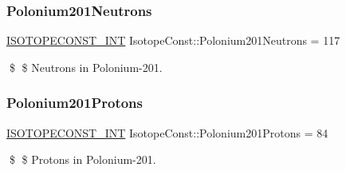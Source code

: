 \subsubsection{\texorpdfstring{Polonium201\+Neutrons}{Polonium201Neutrons}}
{\footnotesize\ttfamily \mbox{\hyperlink{group___isotope_const-_macros_ga5f18360b3e99483a35c32d789e62621c}{I\+S\+O\+T\+O\+P\+E\+C\+O\+N\+S\+T\+\_\+\+I\+NT}} Isotope\+Const\+::\+Polonium201\+Neutrons = 117}

\$ \$ Neutrons in Polonium-\/201. \mbox{\label{group___isotope_const-_polonium-_po201_ga5cd5cc542045caea6db903ac5782fe2f}} 
\subsubsection{\texorpdfstring{Polonium201\+Protons}{Polonium201Protons}}
{\footnotesize\ttfamily \mbox{\hyperlink{group___isotope_const-_macros_ga5f18360b3e99483a35c32d789e62621c}{I\+S\+O\+T\+O\+P\+E\+C\+O\+N\+S\+T\+\_\+\+I\+NT}} Isotope\+Const\+::\+Polonium201\+Protons = 84}

\$ \$ Protons in Polonium-\/201. 